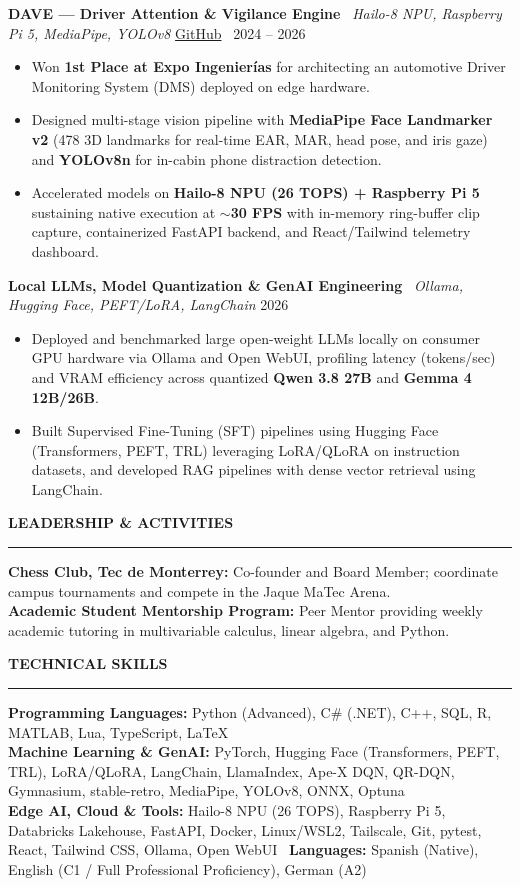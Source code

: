 \documentclass[10pt,letterpaper]{article}
\newcommand{\cvsection}[1]{%
  \vspace{3.5pt}%
  {\small\textbf{\MakeUppercase{#1}}}\\[-3.5pt]%
  \rule{\textwidth}{0.4pt}\par\vspace{2pt}%
}
\begin{document}
\vspace{2pt}
\textbf{DAVE — Driver Attention \& Vigilance Engine} \textbar\ \textit{Hailo-8 NPU, Raspberry Pi 5, MediaPipe, YOLOv8} \hfill \href{https://github.com/LEIA-qro/Attention-Algorithm}{\small GitHub} \textbullet\ 2024 – 2026
\begin{itemize}
    \item Won \textbf{1st Place at Expo Ingenierías} for architecting an automotive Driver Monitoring System (DMS) deployed on edge hardware.
    \item Designed multi-stage vision pipeline with \textbf{MediaPipe Face Landmarker v2} (478 3D landmarks for real-time EAR, MAR, head pose, and iris gaze) and \textbf{YOLOv8n} for in-cabin phone distraction detection.
    \item Accelerated models on \textbf{Hailo-8 NPU (26 TOPS) + Raspberry Pi 5} sustaining native execution at \textbf{$\sim$30 FPS} with in-memory ring-buffer clip capture, containerized FastAPI backend, and React/Tailwind telemetry dashboard.
\end{itemize}

\vspace{2pt}
\textbf{Local LLMs, Model Quantization \& GenAI Engineering} \textbar\ \textit{Ollama, Hugging Face, PEFT/LoRA, LangChain} \hfill 2026
\begin{itemize}
    \item Deployed and benchmarked large open-weight LLMs locally on consumer GPU hardware via Ollama and Open WebUI, profiling latency (tokens/sec) and VRAM efficiency across quantized \textbf{Qwen 3.8 27B} and \textbf{Gemma 4 12B/26B}.
    \item Built Supervised Fine-Tuning (SFT) pipelines using Hugging Face (Transformers, PEFT, TRL) leveraging LoRA/QLoRA on instruction datasets, and developed RAG pipelines with dense vector retrieval using LangChain.
\end{itemize}

\cvsection{Leadership \& Activities}
\textbf{Chess Club, Tec de Monterrey:} Co-founder and Board Member; coordinate campus tournaments and compete in the Jaque MaTec Arena.\\
\textbf{Academic Student Mentorship Program:} Peer Mentor providing weekly academic tutoring in multivariable calculus, linear algebra, and Python.

\cvsection{Technical Skills}
\textbf{Programming Languages:} Python (Advanced), C\# (.NET), C++, SQL, R, MATLAB, Lua, TypeScript, \LaTeX\\
\textbf{Machine Learning \& GenAI:} PyTorch, Hugging Face (Transformers, PEFT, TRL), LoRA/QLoRA, LangChain, LlamaIndex, Ape-X DQN, QR-DQN, Gymnasium, stable-retro, MediaPipe, YOLOv8, ONNX, Optuna\\
\textbf{Edge AI, Cloud \& Tools:} Hailo-8 NPU (26 TOPS), Raspberry Pi 5, Databricks Lakehouse, FastAPI, Docker, Linux/WSL2, Tailscale, Git, pytest, React, Tailwind CSS, Ollama, Open WebUI \textbullet\ \textbf{Languages:} Spanish (Native), English (C1 / Full Professional Proficiency), German (A2)
\end{document}
